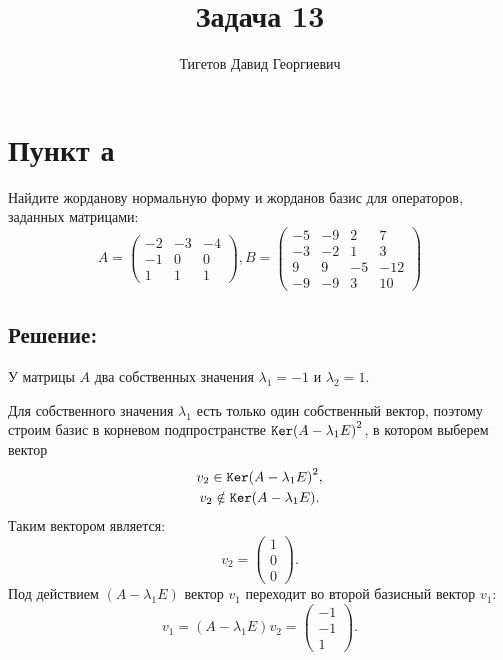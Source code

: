 \documentclass[12pt]{article}
\begin{document}
    \title{Задача 13}
    \author{Тигетов Давид Георгиевич}
    \date{}
    \maketitle

    \section*{Пункт а}
    Найдите жорданову нормальную форму и жорданов базис для операторов, заданных матрицами:
    \[
        A =
        \begin{pmatrix}
            -2 & -3 & -4 \\
            -1 & 0  & 0  \\
            1  & 1  & 1
        \end{pmatrix},
        B =
        \begin{pmatrix}
            -5 & -9 & 2  & 7   \\
            -3 & -2 & 1  & 3   \\
            9  & 9  & -5 & -12 \\
            -9 & -9 & 3  & 10
        \end{pmatrix}
    \]

    \subsection*{Решение:}
    У матрицы $A$ два собственных значения $\lambda_1 = -1$ и $\lambda_2 = 1$.

    Для собственного значения $\lambda_1$ есть только один собственный вектор, поэтому строим базис в корневом подпространстве $\mathtt{Ker}{\left ( A - \lambda_1 E \right)^2}$, в котором
    выберем вектор
    \begin{gather*}
        v_2 \in \mathtt{Ker}{\left ( A - \lambda_1 E \right)^2}, \\
        v_2 \notin \mathtt{Ker}{\left ( A - \lambda_1 E \right)}.
    \end{gather*}
    Таким вектором является:
    \[
        v_2 = \begin{pmatrix}
                  1 \\ 0 \\ 0
        \end{pmatrix}.
    \]
    Под действием $\left ( A - \lambda_1 E \right )$ вектор $v_1$ переходит во второй базисный вектор $v_1$:
    \[
        v_1
        = \left ( A - \lambda_1 E \right ) v_2
        = \begin{pmatrix}
              -1 \\ -1 \\ 1
        \end{pmatrix}.
    \]
\end{document}
